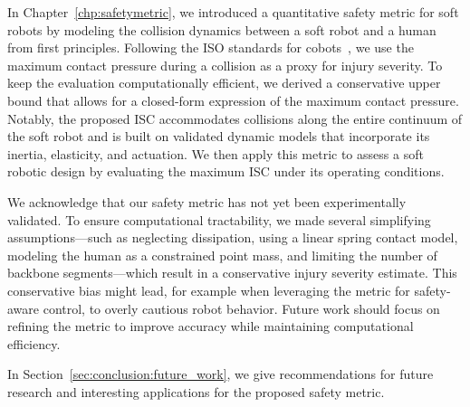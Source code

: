 In Chapter~\ref{chp:safetymetric}, we introduced a quantitative safety metric for soft robots by modeling the collision dynamics between a soft robot and a human from first principles. Following the ISO standards for cobots~\citep{Isots_15066_2016}, we use the maximum contact pressure during a collision as a proxy for injury severity. To keep the evaluation computationally efficient, we derived a conservative upper bound that allows for a closed-form expression of the maximum contact pressure. Notably, the proposed \gls{ISC} accommodates collisions along the entire continuum of the soft robot and is built on validated dynamic models that incorporate its inertia, elasticity, and actuation. We then apply this metric to assess a soft robotic design by evaluating the maximum \gls{ISC} under its operating conditions.

We acknowledge that our safety metric has not yet been experimentally validated. To ensure computational tractability, we made several simplifying assumptions—such as neglecting dissipation, using a linear spring contact model, modeling the human as a constrained point mass, and limiting the number of backbone segments—which result in a conservative injury severity estimate. This conservative bias might lead, for example when leveraging the metric for safety-aware control, to overly cautious robot behavior. Future work should focus on refining the metric to improve accuracy while maintaining computational efficiency.

In Section~\ref{sec:conclusion:future_work}, we give recommendations for future research and interesting applications for the proposed safety metric.

